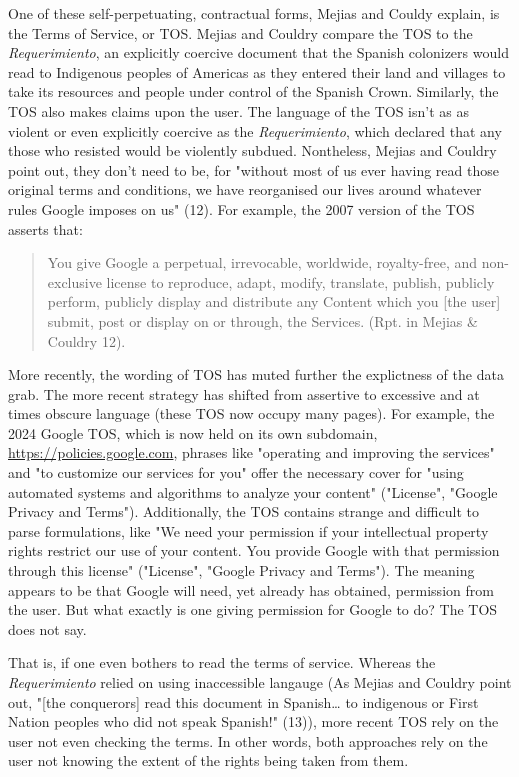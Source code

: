 \documentclass[11pt]{article}
\begin{document}
\begin{enumerate}
One of these self-perpetuating, contractual forms, Mejias and Couldy
explain, is the Terms of Service, or TOS. Mejias and Couldry compare
the TOS to the \emph{Requerimiento}, an explicitly coercive document that
the Spanish colonizers would read to Indigenous peoples of Americas as
they entered their land and villages to take its resources and people
under control of the Spanish Crown. Similarly, the TOS also makes
claims upon the user. The language of the TOS isn't as as violent or
even explicitly coercive as the \emph{Requerimiento}, which declared that
any those who resisted would be violently subdued. Nontheless, Mejias
and Couldry point out, they don't need to be, for "without most of us
ever having read those original terms and conditions, we have
reorganised our lives around whatever rules Google imposes on us"
(12). For example, the 2007 version of the TOS asserts that:
\begin{quote}
You give Google a perpetual, irrevocable, worldwide, royalty-free, and
non-exclusive license to reproduce, adapt, modify, translate, publish,
publicly perform, publicly display and distribute any Content which
you [the user] submit, post or display on or through, the Services.
(Rpt. in Mejias \& Couldry 12).
\end{quote}
More recently, the wording of TOS has muted further the explictness of
the data grab. The more recent strategy has shifted from assertive to
excessive and at times obscure language (these TOS now occupy many
pages). For example, the 2024 Google TOS, which is now held on its own
subdomain, \url{https://policies.google.com}, phrases like "operating and
improving the services" and "to customize our services for you" offer
the necessary cover for "using automated systems and algorithms to
analyze your content" ("License", "Google Privacy and Terms").
Additionally, the TOS contains strange and difficult to parse
formulations, like "We need your permission if your intellectual
property rights restrict our use of your content. You provide Google
with that permission through this license" ("License", "Google Privacy
and Terms"). The meaning appears to be that Google will need, yet
already has obtained, permission from the user. But what exactly is
one giving permission for Google to do? The TOS does not say.

That is, if one even bothers to read the terms of service. Whereas the
\emph{Requerimiento} relied on using inaccessible langauge (As Mejias and
Couldry point out, "[the conquerors] read this document in Spanish\ldots{}
to indigenous or First Nation peoples who did not speak Spanish!"
(13)), more recent TOS rely on the user not even checking the terms.
In other words, both approaches rely on the user not knowing the
extent of the rights being taken from them. 


\end{enumerate}
\end{document}
